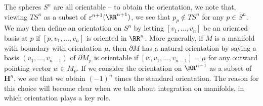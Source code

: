 \begin{example}
The spheres $S^n$ are all orientable -- to obtain the orientation, we note that, viewing $TS^n$ as a subset of $\varepsilon^{n+1}(\RR^{n+1})$, we see that $p_p \not \in TS^n$ for any $p \in S^n$. We may then define an orientation on $S^n$ by letting $[v_1, \dots, v_n]$ be an oriented basis at $p$ if $[p,v_1, \dots, v_n]$ is oriented in $\RR^n$. More generally, if $M$ is a manifold with boundary with orientation $\mu$, then $\partial M$ has a natural orientation by saying a basis $(v_1, \dots, v_{n-1})$ of $\partial M_p$ is orientable if $[w, v_1, \dots, v_{n-1}] = \mu$ for any outward pointing vector $w \in M_p$. If we consider the orientation on $\RR^{n-1}$ as a subset of $\mathbf{H}^n$, we see that we obtain $(-1)^n$ times the standard orientation. The reason for this choice will become clear when we talk about integration on manifolds, in which orientation plays a key role.
\end{example}

